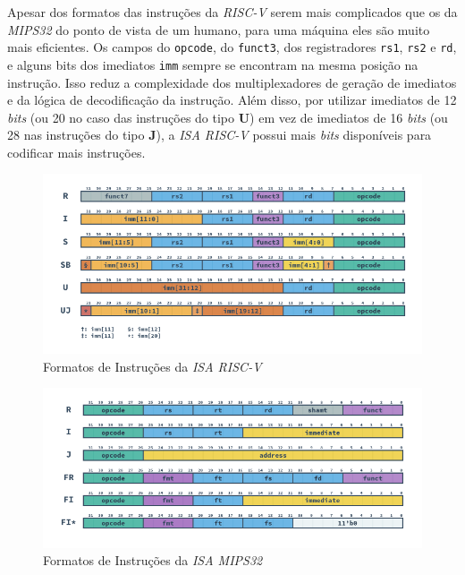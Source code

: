         { Apesar dos formatos das instruções da \textit{RISC-V} serem mais
            complicados que os da \textit{MIPS32} do ponto de vista de um
            humano, para uma máquina eles são muito mais eficientes. Os campos
            do \texttt{opcode}, do \texttt{funct3}, dos registradores \texttt{rs1},
            \texttt{rs2} e \texttt{rd}, e alguns bits dos imediatos \texttt{imm}
            sempre se encontram na mesma posição na instrução. Isso reduz a
            complexidade dos multiplexadores de geração de imediatos e da lógica
            de decodificação da instrução. Além disso, por utilizar imediatos de
            12 \textit{bits} (ou 20 no caso das instruções do tipo \textbf{U})
            em vez de imediatos de 16 \textit{bits} (ou 28 nas instruções do
            tipo \textbf{J}), a \textit{ISA RISC-V} possui mais \textit{bits}
            disponíveis para codificar mais instruções.
        }

        \begin{figure}[H]
        \centering
            \includegraphics[width=.9\linewidth]{../images/RV_Formats.png}
            \caption{Formatos de Instruções da \textit{ISA RISC-V}
                }\label{fig:riscv_formats}
        \end{figure}

        \begin{figure}[H]
        \centering
            \includegraphics[width=.8\linewidth]{../images/MIPS_Formats.png}
            \caption{Formatos de Instruções da \textit{ISA MIPS32}
                }\label{fig:mips_formats}
        \end{figure}

